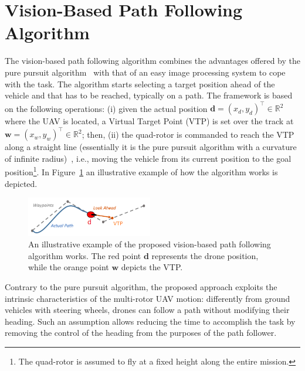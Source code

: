 \documentclass[a4paper,twocolumn,10pt]{article}
\begin{document}
    \section{Vision-Based Path Following Algorithm}
    \label{sec:purPursuitTrackingAlgorithm}

    The vision-based path following algorithm combines the advantages offered by the pure pursuit algorithm~\cite{14_coulter1992implementation} with that of an easy image processing system to cope with the task. The algorithm starts selecting a target position ahead of the vehicle and that has to be reached, typically on a path. The framework is based on the following operations: (i) given 
    the actual position $\mathbf{d}=(x_d, y_d)^\top \in \mathbb{R}^2$ where the UAV is located, 
    a Virtual Target Point (VTP)  is set over the track at $\mathbf{w}=(x_w, y_w)^\top \in \mathbb{R}^2$; then, (ii) the quad-rotor is commanded to reach the VTP along a straight line (essentially it is the pure 
    pursuit algorithm with a curvature of infinite radius)~\cite{14_coulter1992implementation}, i.e., 
    moving the vehicle from its current position to the goal position\footnote{The quad-rotor is assumed to fly at a fixed height along the entire mission.}. 
    In Figure~\ref{fig:pure pursuit} an illustrative example of how the algorithm works is depicted. 

    \begin{figure}
        \centering
        \includegraphics[width=0.49\textwidth]{pics/fig3_path.png}
        \caption{An illustrative example of the proposed vision-based path following algorithm works. 
        The red point $\mathbf{d}$ represents the drone position, while the orange point $\mathbf{w}$ 
        depicts the VTP.}
        \label{fig:pure pursuit}
    \end{figure}

    Contrary to the pure pursuit algorithm, the proposed approach exploits the intrinsic 
    characteristics of the multi-rotor UAV motion: differently from ground vehicles with steering 
    wheels, drones can follow a path without modifying their heading. Such an assumption allows 
    reducing the time to accomplish the task by removing the control of the heading from the purposes 
    of the path follower.
\end{document}
